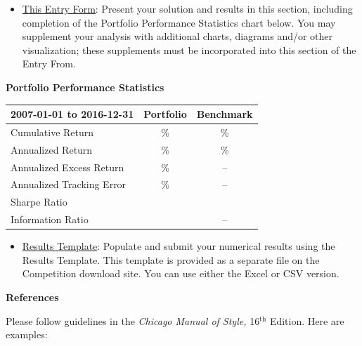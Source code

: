 \documentclass[11pt]{article}
\begin{document}
\begin{itemize}
\item \underline {This Entry Form}: Present your solution and results in this section, including completion of the Portfolio Performance Statistics chart below. You may supplement your analysis with additional charts, diagrams and/or other visualization; these supplements must be incorporated into this section of the Entry From.
\end{itemize}

\begin{center}
\textbf{Portfolio Performance Statistics}\vspace*{-14pt}
\end{center}
\begin{table}[htbp]
\def\arraystretch{1.4}
\begin{center}
\begin{tabular}{|l|c|c|}
\hline
\textbf{2007-01-01 to 2016-12-31}& 
\textbf{Portfolio}& 
\textbf{Benchmark} \\
\hline
Cumulative Return& 
{\%}& 
{\%} \\
\hline
Annualized Return& 
{\%}& 
{\%} \\
\hline
Annualized Excess Return& 
{\%}& 
-- \\
\hline
Annualized Tracking Error& 
{\%}& 
-- \\
\hline
Sharpe Ratio& 
& 
 \\
\hline
Information Ratio& 
& 
-- \\
\hline
\end{tabular}
\label{tab1}
\end{center}
\end{table}

\begin{itemize}
\item \underline {Results Template}: Populate and submit your numerical results using the Results Template. This template is provided as a separate file on the Competition download site. You can use either the Excel or CSV version.
\end{itemize}

\textbf{References}

\bgroup
\parskip0pt

Please follow guidelines in the \textit{Chicago Manual of Style,} 16$^{\text{th}}$ Edition. Here are examples: 
\end{document}
